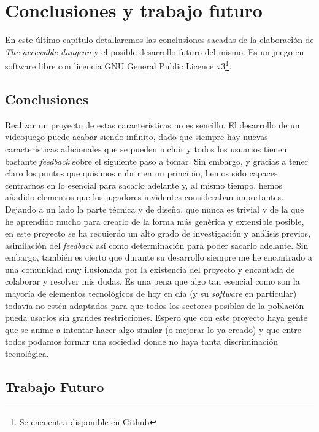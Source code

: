 \chapter{Conclusiones y trabajo futuro}

En este último capítulo detallaremos las conclusiones sacadas de la elaboración de \textit{The accessible dungeon} y el posible desarrollo futuro del mismo. Es un juego en software libre con licencia GNU General Public Licence v3\footnote{\href{https://github.com/dpenas/roomsgame}{Se encuentra disponible en Github}}.

\section{Conclusiones}

Realizar un proyecto de estas características no es sencillo. El desarrollo de un videojuego puede acabar siendo infinito, dado que siempre hay nuevas características adicionales que se pueden incluir y todos los usuarios tienen bastante \textit{feedback} sobre el siguiente paso a tomar. Sin embargo, y gracias a tener claro los puntos que quisimos cubrir en un principio, hemos sido capaces centrarnos en lo esencial para sacarlo adelante y, al mismo tiempo, hemos añadido elementos que los jugadores invidentes consideraban importantes.
Dejando a un lado la parte técnica y de diseño, que nunca es trivial y de la que he aprendido mucho para crearlo de la forma más genérica y extensible posible, en este proyecto se ha requierdo un alto grado de investigación y análisis previos, asimilación del \textit{feedback} así como determinación para poder sacarlo adelante. Sin embargo, también es cierto que durante su desarrollo siempre me he encontrado a una comunidad muy ilusionada por la existencia del proyecto y encantada de colaborar y resolver mis dudas.
Es una pena que algo tan esencial como son la mayoría de elementos tecnológicos de hoy en día (y su \textit{software} en particular) todavía no estén adaptados para que todos los sectores posibles de la población pueda usarlos sin grandes restricciones. Espero que con este proyecto haya gente que se anime a intentar hacer algo similar (o mejorar lo ya creado) y que entre todos podamos formar una sociedad donde no haya tanta discriminación tecnológica.

\section{Trabajo Futuro}

